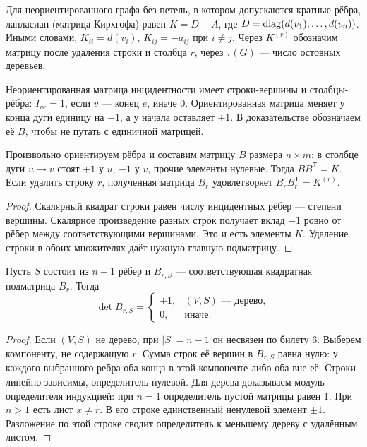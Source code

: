 \begin{definition}
Для неориентированного графа без петель, в котором допускаются кратные рёбра,
лапласиан (матрица Кирхгофа) равен \(K=D-A\), где \(D=\operatorname{diag}(d(v_1),\ldots,d(v_n))\).
Иными словами, \(K_{ii}=d(v_i)\), \(K_{ij}=-a_{ij}\) при \(i\ne j\).
Через \(K^{(r)}\) обозначим матрицу после удаления строки и столбца \(r\),
через \(\tau(G)\) — число остовных деревьев.
\end{definition}
\begin{definition}
Неориентированная матрица инцидентности имеет строки-вершины и столбцы-рёбра:
\(I_{ve}=1\), если \(v\) — конец \(e\), иначе \(0\).
Ориентированная матрица меняет у конца дуги единицу на \(-1\),
а у начала оставляет \(+1\). В доказательстве обозначаем её \(B\),
чтобы не путать с единичной матрицей.
\end{definition}
\begin{lemma}
Произвольно ориентируем рёбра и составим матрицу \(B\) размера \(n\times m\):
в столбце дуги \(u\to v\) стоят \(+1\) у \(u\), \(-1\) у \(v\), прочие элементы нулевые.
Тогда \(BB^{\mathsf T}=K\). Если удалить строку \(r\), полученная матрица \(B_r\)
удовлетворяет \(B_rB_r^{\mathsf T}=K^{(r)}\).
\end{lemma}
\begin{proof}
Скалярный квадрат строки равен числу инцидентных рёбер — степени вершины.
Скалярное произведение разных строк получает вклад \(-1\) ровно от рёбер
между соответствующими вершинами. Это и есть элементы \(K\).
Удаление строки в обоих множителях даёт нужную главную подматрицу.
\end{proof}
\begin{lemma}
Пусть \(S\) состоит из \(n-1\) рёбер и \(B_{r,S}\) — соответствующая
квадратная подматрица \(B_r\). Тогда
\[
 \det B_{r,S}=\begin{cases}\pm1,&(V,S)\text{ — дерево},\\0,&\text{иначе}.\end{cases}
\]
\end{lemma}
\begin{proof}
Если \((V,S)\) не дерево, при \(|S|=n-1\) он несвязен по билету 6.
Выберем компоненту, не содержащую \(r\). Сумма строк её вершин
в \(B_{r,S}\) равна нулю: у каждого выбранного ребра оба конца в этой
компоненте либо оба вне её. Строки линейно зависимы, определитель нулевой.
Для дерева доказываем модуль определителя индукцией: при \(n=1\)
определитель пустой матрицы равен 1. При \(n>1\) есть лист \(x\ne r\).
В его строке единственный ненулевой элемент \(\pm1\). Разложение по этой
строке сводит определитель к меньшему дереву с удалённым листом.
\end{proof}


